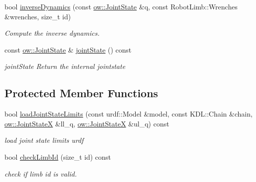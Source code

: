 \begin{DoxyCompactItemize}
bool \hyperlink{classow__ik_1_1RobotModel_ad921c80bc70653ab5fa10fdf5b8a1cdf}{inverse\+Dynamics} (const \hyperlink{classow__core_1_1JointState}{ow\+::\+Joint\+State} \&q, const Robot\+Limb\+::\+Wrenches \&wrenches, size\+\_\+t id)
\begin{DoxyCompactList}\small\item\em Compute the inverse dynamics. \end{DoxyCompactList}\item 
const \hyperlink{classow__core_1_1JointState}{ow\+::\+Joint\+State} \& \hyperlink{classow__ik_1_1RobotModel_a3fee1d80d42134468cedc6cdd924dcf0}{joint\+State} () const \hypertarget{classow__ik_1_1RobotModel_a3fee1d80d42134468cedc6cdd924dcf0}{}\label{classow__ik_1_1RobotModel_a3fee1d80d42134468cedc6cdd924dcf0}

\begin{DoxyCompactList}\small\item\em joint\+State Return the internal jointstate \end{DoxyCompactList}\end{DoxyCompactItemize}
\subsection*{Protected Member Functions}
\begin{DoxyCompactItemize}
\item 
bool \hyperlink{classow__ik_1_1RobotModel_a05032fa5180c92c671aeec221d93900d}{load\+Joint\+State\+Limits} (const urdf\+::\+Model \&model, const K\+D\+L\+::\+Chain \&chain, \hyperlink{classow__core_1_1JointState}{ow\+::\+Joint\+StateX} \&ll\+\_\+q, \hyperlink{classow__core_1_1JointState}{ow\+::\+Joint\+StateX} \&ul\+\_\+q) const 
\begin{DoxyCompactList}\small\item\em load joint state limits urdf \end{DoxyCompactList}\item 
bool \hyperlink{classow__ik_1_1RobotModel_a79dbbb64cc8f4fc5519122918bb1a390}{check\+Limb\+Id} (size\+\_\+t id) const \hypertarget{classow__ik_1_1RobotModel_a79dbbb64cc8f4fc5519122918bb1a390}{}\label{classow__ik_1_1RobotModel_a79dbbb64cc8f4fc5519122918bb1a390}

\begin{DoxyCompactList}\small\item\em check if limb id is valid. \end{DoxyCompactList}\end{DoxyCompactItemize}
